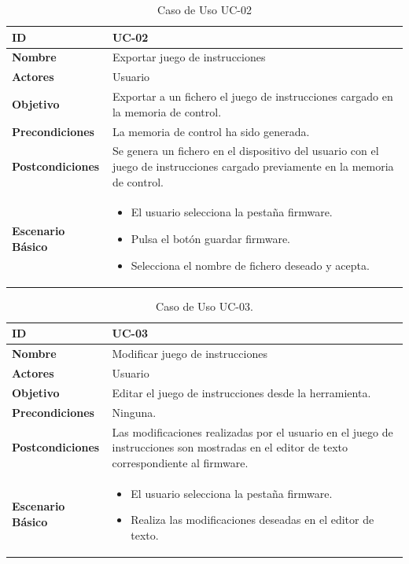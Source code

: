\begin{center}
\begin{table}[htbp]
\centering
\begin{tabular}{@{}p{2.5cm} p{9cm}@{}} 
\toprule
\textbf{ID}	& UC-02  \\
\midrule
\textbf{Nombre} 		& Exportar juego de instrucciones   \\
\midrule
\textbf{Actores} 		&	Usuario  \\
\midrule
\textbf{Objetivo} 	&	Exportar a un fichero el juego de instrucciones cargado en la memoria de control. 	 \\
\midrule
\textbf{Precondiciones}	&	La memoria de control ha sido generada.   \\
\midrule
\textbf{Postcondiciones} 	& Se genera un fichero en el dispositivo del usuario con el juego de instrucciones cargado previamente en la memoria de control.   \\
\midrule
\textbf{Escenario Básico} 	&  \begin{itemize}
\item El usuario selecciona la pestaña firmware.
\item Pulsa el botón guardar firmware.
\item Selecciona el nombre de fichero deseado y acepta.
\end{itemize} \\
\bottomrule
\end{tabular}
\caption{Caso de Uso UC-02}
\label{tab:uc02}
\end{table}
\end{center}

\begin{center}
\begin{table}[htbp]
\centering
\begin{tabular}{@{}p{2.5cm} p{9cm}@{}} 
\toprule
\textbf{ID}	& UC-03  \\
\midrule
\textbf{Nombre} 		& Modificar juego de instrucciones   \\
\midrule
\textbf{Actores} 		&	Usuario  \\
\midrule
\textbf{Objetivo} 	&	Editar el juego de instrucciones desde la herramienta. 	 \\
\midrule
\textbf{Precondiciones}	&	Ninguna.   \\
\midrule
\textbf{Postcondiciones} 	& Las modificaciones realizadas por el usuario en el juego de instrucciones son mostradas en el editor de texto correspondiente al firmware.   \\
\midrule
\textbf{Escenario Básico} 	&  \begin{itemize}
\item El usuario selecciona la pestaña firmware.
\item Realiza las modificaciones deseadas en el editor de texto.
\end{itemize} \\
\bottomrule
\end{tabular}
\caption{Caso de Uso UC-03.}
\label{tab:uc03}
\end{table}
\end{center}

